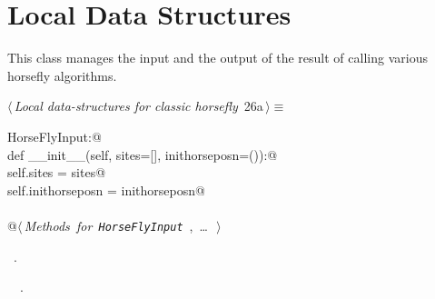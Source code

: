\documentclass[11.5pt]{report}
\begin{document}
\needspace{7cm}
\section{Local Data Structures}

\newchunk This class manages the input and the output of the result of 
calling various horsefly algorithms. 

\begin{flushleft} \small
\begin{minipage}{\linewidth}\label{scrap30}\raggedright\small
{} $\langle\,${\itshape Local data-structures for classic horsefly}\nobreak\ {\footnotesize {26a}}$\,\rangle\equiv$
\vspace{-1ex}
\begin{list}{}{} \item
\mbox{}\verb@class HorseFlyInput:@\\
\mbox{}\verb@      def __init__(self, sites=[], inithorseposn=()):@\\
\mbox{}\verb@           self.sites         = sites@\\
\mbox{}\verb@           self.inithorseposn = inithorseposn@\\
\mbox{}\verb@@\\
\mbox{}\verb@      @\hbox{$\langle\,${\itshape Methods for \verb|HorseFlyInput|}\nobreak\ {\footnotesize {}, \ldots\ }$\,\rangle$}\verb@@\\
\mbox{}\verb@@{\NWsep}
\end{list}
\vspace{-1.5ex}
\footnotesize
\begin{list}{}{\setlength{\itemsep}{-\parsep}\setlength{\itemindent}{-\leftmargin}}
\item \NWtxtMacroRefIn\ .
\item \NWtxtIdentsDefed\nobreak\  \verb@HorseFlyInput@\nobreak\ .
\item{}
\end{list}
\end{minipage}\vspace{4ex}
\end{flushleft}
\end{document}
